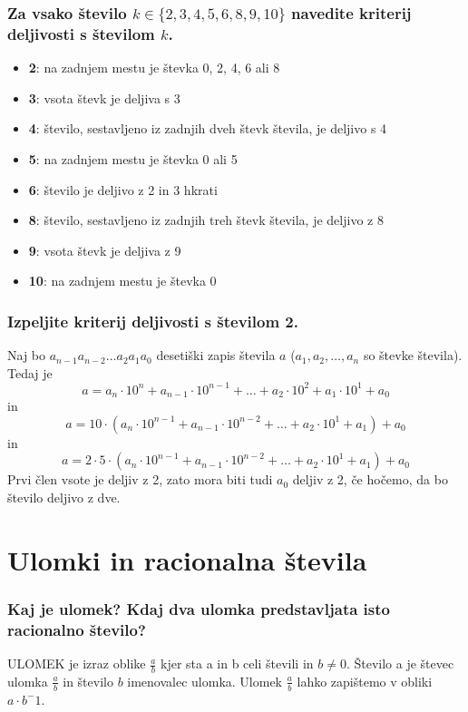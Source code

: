 \documentclass{article}
\begin{document}
\subsubsection*{Za vsako število $k \in\{2,3,4,5,6,8,9,10\}$ navedite kriterij deljivosti s številom $k$.}
\begin{itemize}
\item \textbf{2}: na zadnjem mestu je števka 0, 2, 4, 6 ali 8
\item \textbf{3}: vsota števk je deljiva s 3
\item \textbf{4}: število, sestavljeno iz zadnjih dveh števk števila, je deljivo s 4
\item \textbf{5}: na zadnjem mestu je števka 0 ali 5
\item \textbf{6}: število je deljivo z 2 in 3 hkrati
\item \textbf{8}: število, sestavljeno iz zadnjih treh števk števila, je deljivo z 8
\item \textbf{9}: vsota števk je deljiva z 9
\item \textbf{10}: na zadnjem mestu je števka 0
\end{itemize}
\subsubsection*{Izpeljite kriterij deljivosti s številom 2.}

Naj bo \( a_{n-1}a_{n-2} \ldots a_2a_1a_0 \) desetiški zapis števila \( a \) (\( a_1, a_2, \ldots, a_n \) so števke števila).
Tedaj je
\[
a = a_n \cdot 10^n + a_{n-1} \cdot 10^{n-1} + \ldots + a_2 \cdot 10^2 + a_1 \cdot 10^1 + a_0 
\]
in
\[
a = 10 \cdot (a_n \cdot 10^{n-1} + a_{n-1} \cdot 10^{n-2} + \ldots + a_2 \cdot 10^1 + a_1 ) + a_0 
\]
in
\[
a = 2 \cdot 5 \cdot (a_n \cdot 10^{n-1} + a_{n-1} \cdot 10^{n-2} + \ldots + a_2 \cdot 10^1 + a_1 ) + a_0
\]
Prvi člen vsote je deljiv z 2, zato mora biti tudi $a_0$ deljiv z 2, če hočemo, da bo število deljivo z dve.
\section{Ulomki in racionalna števila}
\subsubsection*{Kaj je ulomek? Kdaj dva ulomka predstavljata isto racionalno število?}
ULOMEK je izraz oblike $\frac{a}{b}$  kjer sta a in b celi števili in $b \neq 0$. Število a je števec ulomka $\frac{a}{b}$ in število $b$ imenovalec ulomka. Ulomek $\frac{a}{b}$ lahko zapištemo v obliki $a \cdot b^-1$. 
\end{document}
